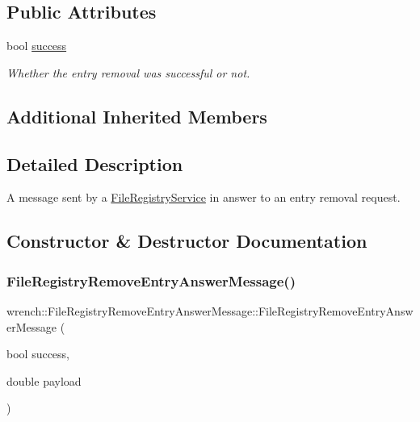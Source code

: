 \subsection*{Public Attributes}
\begin{DoxyCompactItemize}
\item 
\mbox{\label{classwrench_1_1_file_registry_remove_entry_answer_message_a5edfc1eaec9d8bc8ea7795bc4a114dd1}} 
bool \hyperlink{classwrench_1_1_file_registry_remove_entry_answer_message_a5edfc1eaec9d8bc8ea7795bc4a114dd1}{success}
\begin{DoxyCompactList}\small\item\em Whether the entry removal was successful or not. \end{DoxyCompactList}\end{DoxyCompactItemize}
\subsection*{Additional Inherited Members}


\subsection{Detailed Description}
A message sent by a \hyperlink{classwrench_1_1_file_registry_service}{File\+Registry\+Service} in answer to an entry removal request. 

\subsection{Constructor \& Destructor Documentation}
\mbox{\label{classwrench_1_1_file_registry_remove_entry_answer_message_a8df6a5b3664ab9bd434ca7923aaa5beb}} 
\subsubsection{\texorpdfstring{File\+Registry\+Remove\+Entry\+Answer\+Message()}{FileRegistryRemoveEntryAnswerMessage()}}
{\footnotesize\ttfamily wrench\+::\+File\+Registry\+Remove\+Entry\+Answer\+Message\+::\+File\+Registry\+Remove\+Entry\+Answer\+Message (\begin{DoxyParamCaption}\item[{bool}]{success,  }\item[{double}]{payload }\end{DoxyParamCaption})}



